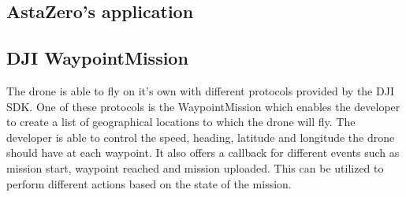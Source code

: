\subsection{AstaZero's application} \label{AZ's app}
\subsection{DJI WaypointMission}
The drone is able to fly on it's own with different protocols provided by the DJI SDK. One of these protocols is the WaypointMission \cite{WaypointMission} which enables the developer to create a list of geographical locations to which the drone will fly. The developer is able to control the speed, heading, latitude and longitude the drone should have at each waypoint. It also offers a callback for different events such as mission start, waypoint reached and mission uploaded. This can be utilized to perform different actions based on the state of the mission.  

